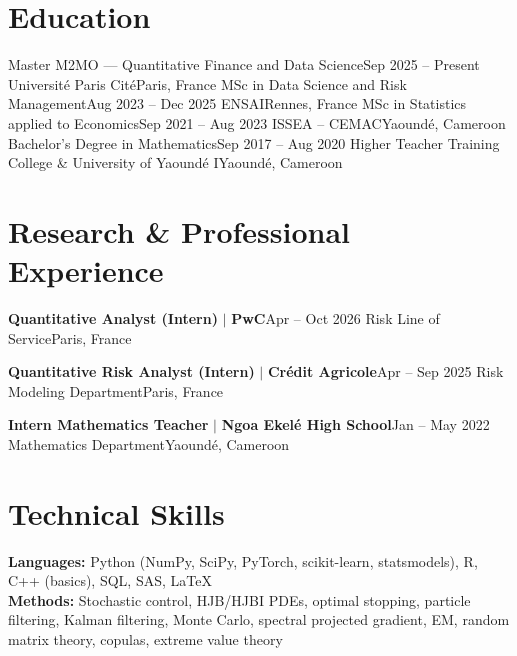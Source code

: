 \section{Education}
\resumeSubHeadingListStart
  \resumeSubheading
    {Master M2MO --- Quantitative Finance and Data Science}{Sep 2025 -- Present}
    {Universit\'e Paris Cit\'e}{Paris, France}
  \vspace{3pt}
  \resumeSubheading
    {MSc in Data Science and Risk Management}{Aug 2023 -- Dec 2025}
    {ENSAI}{Rennes, France}
  \vspace{3pt}
  \resumeSubheading
    {MSc in Statistics applied to Economics}{Sep 2021 -- Aug 2023}
    {ISSEA -- CEMAC}{Yaound\'e, Cameroon}
  \vspace{3pt}
  \resumeSubheading
    {Bachelor's Degree in Mathematics}{Sep 2017 -- Aug 2020}
    {Higher Teacher Training College \& University of Yaound\'e I}{Yaound\'e, Cameroon}
\resumeSubHeadingListEnd

\section{Research \& Professional Experience}
\resumeSubHeadingListStart
  \resumeSubheading
    {\textbf{Quantitative Analyst (Intern)} $|$ \textbf{PwC}}{Apr -- Oct 2026}
    {Risk Line of Service}{Paris, France}
    \resumeItemListStart
    \resumeItemListEnd

  \resumeSubheading
    {\textbf{Quantitative Risk Analyst (Intern)} $|$ \textbf{Cr\'edit Agricole}}{Apr -- Sep 2025}
    {Risk Modeling Department}{Paris, France}
    \resumeItemListStart
    \resumeItemListEnd

  \resumeSubheading
    {\textbf{Intern Mathematics Teacher} $|$ \textbf{Ngoa Ekel\'e High School}}{Jan -- May 2022}
    {Mathematics Department}{Yaound\'e, Cameroon}
    \resumeItemListStart
    \resumeItemListEnd
\resumeSubHeadingListEnd

\section{Technical Skills}
\begin{itemize}[leftmargin=0.15in, label={}]
  \small{\item{
    \textbf{Languages:} Python (NumPy, SciPy, PyTorch, scikit-learn, statsmodels), R, C++ (basics), SQL, SAS, \LaTeX \\
    \textbf{Methods:} Stochastic control, HJB/HJBI PDEs, optimal stopping, particle filtering, Kalman filtering, Monte Carlo, spectral projected gradient, EM, random matrix theory, copulas, extreme value theory
  }}
\end{itemize}

